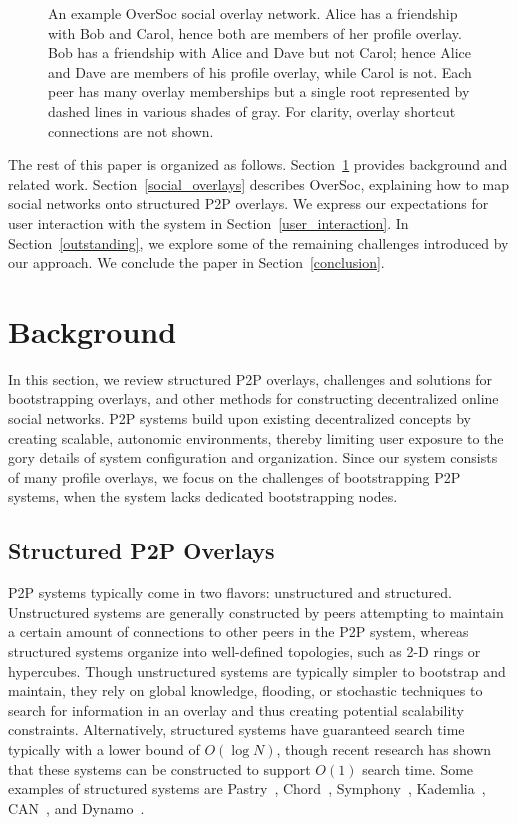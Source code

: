 \documentclass{IEEEtran}
\begin{document}
\begin{figure}[h]
\centering
{}
\caption{An example OverSoc social overlay network.  Alice has a friendship
with Bob and Carol, hence both are members of her profile overlay. Bob has a
friendship with Alice and Dave but not Carol; hence Alice and Dave are members
of his profile overlay, while Carol is not.  Each peer has many overlay
memberships but a single root represented by dashed lines in various shades of
gray.  For clarity, overlay shortcut connections are not shown.}
\label{fig:system}
\end{figure}

The rest of this paper is organized as follows.  Section~\ref{background}
provides background and related work.  Section~\ref{social_overlays} describes
OverSoc, explaining how to map social networks onto structured P2P overlays.
We express our expectations for user interaction with the system in
Section~\ref{user_interaction}.  In Section~\ref{outstanding}, we explore some
of the remaining challenges introduced by our approach.  We conclude the paper
in Section~\ref{conclusion}.

\section{Background}
\label{background}

In this section, we review structured P2P overlays, challenges and solutions
for bootstrapping overlays, and other methods for constructing decentralized
online social networks.  P2P systems build upon existing decentralized concepts
by creating scalable, autonomic environments, thereby limiting user exposure to
the gory details of system configuration and organization.  Since our system
consists of many profile overlays, we focus on the challenges of bootstrapping
P2P systems, when the system lacks dedicated bootstrapping nodes.

\subsection{Structured P2P Overlays}

P2P systems typically come in two flavors:  unstructured and structured.
Unstructured systems are generally constructed by peers attempting to maintain
a certain amount of connections to other peers in the P2P system, whereas
structured systems organize into well-defined topologies, such as 2-D rings or
hypercubes.  Though unstructured systems are typically simpler to bootstrap and
maintain, they rely on global knowledge, flooding, or stochastic techniques to
search for information in an overlay and thus creating potential scalability
constraints.  Alternatively, structured systems have guaranteed search time
typically with a lower bound of $O(\log N)$, though recent research has shown
that these systems can be constructed to support $O(1)$ search time.  Some
examples of structured systems are Pastry~\cite{pastry}, Chord~\cite{chord},
Symphony~\cite{symphony}, Kademlia~\cite{kademlia}, CAN~\cite{can}, and
Dynamo~\cite{dynamo}.
\end{document}

